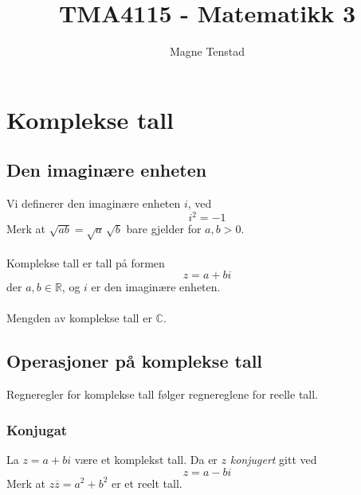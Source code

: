 \documentclass{article}
\title{TMA4115 - Matematikk 3}
\author{Magne Tenstad}
\begin{document}
\maketitle

\clearpage

\tableofcontents




\clearpage
\section{Komplekse tall}


\subsection{Den imaginære enheten}
Vi definerer den imaginære enheten $i$, ved
\[ i^2 = -1 \]
Merk at $ \sqrt{ab} = \sqrt{a} \, \sqrt{b} $ bare gjelder for $a, b > 0$.
\\\\
Komplekse tall er tall på formen
\[ z = a + bi \]
der $a, b \in \mathbb{R}$, og $i$ er den imaginære enheten.
\\\\
Mengden av komplekse tall er $\mathbb{C}$.


\subsection{Operasjoner på komplekse tall}
Regneregler for komplekse tall følger regnereglene for reelle tall.


\subsubsection{Konjugat}
La $z = a + bi$ være et komplekst tall. Da er $z$ \textit{konjugert} gitt ved
\[ z = a - bi \]
Merk at $z\overline{z} = a^2 + b^2$ er et reelt tall.
\end{document}
